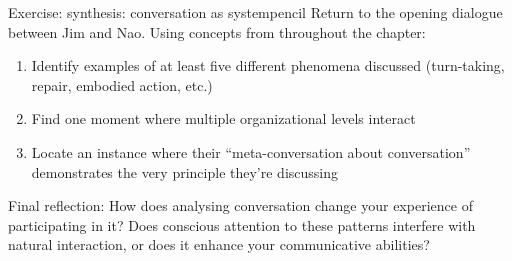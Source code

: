 \begin{tblsframedsymbol}{Exercise: synthesis: conversation as system}{pencil}
Return to the opening dialogue between Jim and Nao. Using concepts from throughout the chapter:
\begin{enumerate}[noitemsep, leftmargin=*]
    \item Identify examples of at least five different phenomena discussed (turn-taking, repair, embodied action, etc.)
    \item Find one moment where multiple organizational levels interact
    \item Locate an instance where their \enquote{meta-conversation about conversation} demonstrates the very principle they're discussing
\end{enumerate}
Final reflection: How does analysing conversation change your experience of participating in it? Does conscious attention to these patterns interfere with natural interaction, or does it enhance your communicative abilities?
\end{tblsframedsymbol}

